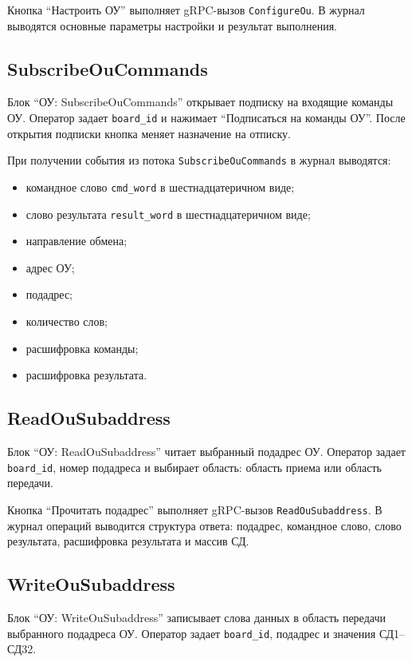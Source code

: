 Кнопка ``Настроить ОУ'' выполняет gRPC-вызов \texttt{ConfigureOu}. В журнал выводятся основные параметры настройки и результат выполнения.

\subsection{SubscribeOuCommands}

Блок ``ОУ: SubscribeOuCommands'' открывает подписку на входящие команды ОУ. Оператор задает \texttt{board\_id} и нажимает ``Подписаться на команды ОУ''. После открытия подписки кнопка меняет назначение на отписку.

При получении события из потока \texttt{SubscribeOuCommands} в журнал выводятся:

\begin{itemize}
	\item командное слово \texttt{cmd\_word} в шестнадцатеричном виде;
	\item слово результата \texttt{result\_word} в шестнадцатеричном виде;
	\item направление обмена;
	\item адрес ОУ;
	\item подадрес;
	\item количество слов;
	\item расшифровка команды;
	\item расшифровка результата.
\end{itemize}

\subsection{ReadOuSubaddress}

Блок ``ОУ: ReadOuSubaddress'' читает выбранный подадрес ОУ. Оператор задает \texttt{board\_id}, номер подадреса и выбирает область: область приема или область передачи.

Кнопка ``Прочитать подадрес'' выполняет gRPC-вызов \texttt{ReadOuSubaddress}. В журнал операций выводится структура ответа: подадрес, командное слово, слово результата, расшифровка результата и массив СД.

\subsection{WriteOuSubaddress}

Блок ``ОУ: WriteOuSubaddress'' записывает слова данных в область передачи выбранного подадреса ОУ. Оператор задает \texttt{board\_id}, подадрес и значения СД1--СД32.

